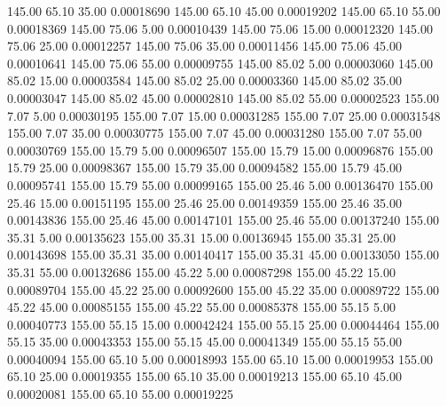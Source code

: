     145.00     65.10     35.00     0.00018690
    145.00     65.10     45.00     0.00019202
    145.00     65.10     55.00     0.00018369
    145.00     75.06      5.00     0.00010439
    145.00     75.06     15.00     0.00012320
    145.00     75.06     25.00     0.00012257
    145.00     75.06     35.00     0.00011456
    145.00     75.06     45.00     0.00010641
    145.00     75.06     55.00     0.00009755
    145.00     85.02      5.00     0.00003060
    145.00     85.02     15.00     0.00003584
    145.00     85.02     25.00     0.00003360
    145.00     85.02     35.00     0.00003047
    145.00     85.02     45.00     0.00002810
    145.00     85.02     55.00     0.00002523
    155.00      7.07      5.00     0.00030195
    155.00      7.07     15.00     0.00031285
    155.00      7.07     25.00     0.00031548
    155.00      7.07     35.00     0.00030775
    155.00      7.07     45.00     0.00031280
    155.00      7.07     55.00     0.00030769
    155.00     15.79      5.00     0.00096507
    155.00     15.79     15.00     0.00096876
    155.00     15.79     25.00     0.00098367
    155.00     15.79     35.00     0.00094582
    155.00     15.79     45.00     0.00095741
    155.00     15.79     55.00     0.00099165
    155.00     25.46      5.00     0.00136470
    155.00     25.46     15.00     0.00151195
    155.00     25.46     25.00     0.00149359
    155.00     25.46     35.00     0.00143836
    155.00     25.46     45.00     0.00147101
    155.00     25.46     55.00     0.00137240
    155.00     35.31      5.00     0.00135623
    155.00     35.31     15.00     0.00136945
    155.00     35.31     25.00     0.00143698
    155.00     35.31     35.00     0.00140417
    155.00     35.31     45.00     0.00133050
    155.00     35.31     55.00     0.00132686
    155.00     45.22      5.00     0.00087298
    155.00     45.22     15.00     0.00089704
    155.00     45.22     25.00     0.00092600
    155.00     45.22     35.00     0.00089722
    155.00     45.22     45.00     0.00085155
    155.00     45.22     55.00     0.00085378
    155.00     55.15      5.00     0.00040773
    155.00     55.15     15.00     0.00042424
    155.00     55.15     25.00     0.00044464
    155.00     55.15     35.00     0.00043353
    155.00     55.15     45.00     0.00041349
    155.00     55.15     55.00     0.00040094
    155.00     65.10      5.00     0.00018993
    155.00     65.10     15.00     0.00019953
    155.00     65.10     25.00     0.00019355
    155.00     65.10     35.00     0.00019213
    155.00     65.10     45.00     0.00020081
    155.00     65.10     55.00     0.00019225
